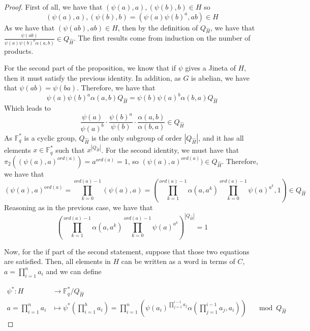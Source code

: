 \documentclass{article}
\begin{document}
\begin{proof}
    First of all, we have that $(\psi(a),a), (\psi(b),b) \in H$ so
    \begin{equation}
        (\psi(a),a), (\psi(b),b) = ( \psi(a) \psi(b)^a, ab) \in H
    \end{equation}
    As we have that $(\psi(ab),ab) \in H$, then by the definition of $Q_{\hat{H}}$, we have that $ \frac{\psi(ab)}{\psi(a) \psi(b)^a \alpha(a,b)} \in Q_{\hat{H}}$. The first results come from induction on the number of products. 

    For the second part of the proposition, we know that if $\psi$ gives a Jineta of $H$, then it must satisfy the previous identity. In addition, as $G$ is abelian, we have that $\psi(ab) = \psi(ba)$. Therefore, we have that 
    \begin{equation}
        \psi(a) \psi(b)^a \alpha(a,b) Q_{\hat{H}} = \psi(b) \psi(a)^b \alpha(b,a)Q_{\hat{H}}
    \end{equation}
 Which leads to 
    \begin{equation}
         \frac{\psi(a)}{\psi(a)^b} \cdot \frac{\psi(b)^a}{\psi(b)} \cdot \frac{\alpha(a,b)}{\alpha(b,a)}  \in Q_{\hat{H}}
    \end{equation}
    As $\mathbb{F}_q^*$ is a cyclic group, $Q_{\hat{H}}$ is the only subgroup of order $ |Q_{\hat{H}}|$, and it has all elements $x\in \mathbb{F}_q^*$ such that $x^{|Q_{\hat{H}}|}$. For the second identity, we must have that $\pi_2((\psi(a),a)^{ord(a)}) = a^{ord(a)} = 1$, so $(\psi(a),a)^{ord(a)}) \in Q_{\hat{H}}$. Therefore, we have that 
    \begin{equation}
        (\psi(a),a)^{ord(a)} = \prod_{k=0}^{ord(a)-1}(\psi(a),a) = \left(\prod_{k=1}^{ord(a)-1}\alpha(a,a^k) \prod_{k=0}^{ord(a)-1} \psi(a)^{a^k}, 1\right) \in Q_{\hat{H}} 
    \end{equation}
    Reasoning as in the previous case, we have that 
    \begin{equation}
        \left(\prod_{k=1}^{ord(a)-1}\alpha(a,a^k) \prod_{k=0}^{ord(a)-1} \psi(a)^{a^k}\right) ^ { |Q_{\hat{H}}|} =1
    \end{equation}

    Now, for the if part of the second statement, suppose that those two equations are satisfied. Then, all elements in $H$ can be written as a word in terms of $C$, $ a=\prod_{i=1}^n a_i$ and we can define
    
    \begin{align*}
    \psi^* :  H &  \longrightarrow \mathbb{F}_q^* / Q_{\hat{H}} \\
        a=\prod_{i=1}^n a_i &\longmapsto \psi^*\left( \prod_{i=1}^h a_i \right) = \prod_{i=1}^{n} \left( \psi(a_i)^{\prod_{j=1}^{i-1} a_j} \alpha\left(\prod_{j=1}^{i-1} a_j, a_i\right)\right) \quad \mod Q_{\hat{H}} 
    \end{align*}
    

\end{proof}
\end{document}
